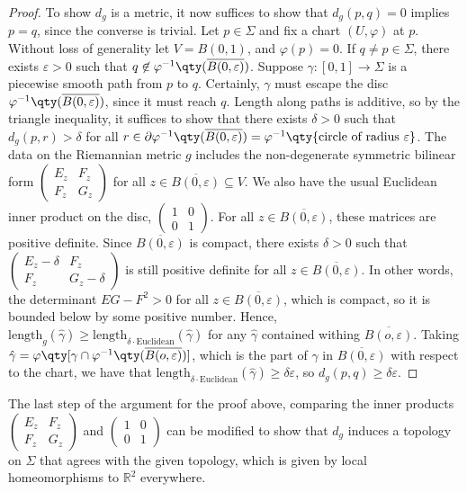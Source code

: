 \begin{proof}
	To show $d_g$ is a metric, it now suffices to show that $d_g(p,q) = 0$ implies $p = q$, since the converse is trivial.
	Let $p \in \Sigma$ and fix a chart $(U,\varphi)$ at $p$.
	Without loss of generality let $V = B(0,1)$, and $\varphi(p) = 0$.
	If $q \neq p \in \Sigma$, there exists $\varepsilon > 0$ such that $q \not\in \varphi^{-1} \qty(\overline{B(0,\varepsilon)})$.
	Suppose $\gamma \colon [0,1] \to \Sigma$ is a piecewise smooth path from $p$ to $q$.
	Certainly, $\gamma$ must escape the disc $\varphi^{-1} \qty(\overline{B(0,\varepsilon)})$, since it must reach $q$.
	Length along paths is additive, so by the triangle inequality, it suffices to show that there exists $\delta > 0$ such that $d_g(p,r) > \delta$ for all $r \in \partial \varphi^{-1} \qty(\overline{B(0,\varepsilon)}) = \varphi^{-1} \qty{ \text{circle of radius } \varepsilon }$.
	The data on the Riemannian metric $g$ includes the non-degenerate symmetric bilinear form $\begin{pmatrix}
		E_z & F_z \\
		F_z & G_z
	\end{pmatrix}$ for all $z \in \overline{B(0,\varepsilon)} \subseteq V$.
	We also have the usual Euclidean inner product on the disc, $\begin{pmatrix}
		1 & 0 \\
		0 & 1
	\end{pmatrix}$.
	For all $z \in \overline{B(0,\varepsilon)}$, these matrices are positive definite.
	Since $\overline{B(0,\varepsilon)}$ is compact, there exists $\delta > 0$ such that
	$\begin{pmatrix}
		E_z - \delta & F_z          \\
		F_z          & G_z - \delta
	\end{pmatrix}$
	is still positive definite for all $z \in \overline{B(0,\varepsilon)}$.
	In other words, the determinant $EG-F^2 > 0$ for all $z \in \overline{B(0,\varepsilon)}$, which is compact, so it is bounded below by some positive number.
	Hence, $\mathrm{length}_g(\hat\gamma) \geq \mathrm{length}_{\delta \cdot \mathrm{Euclidean}}(\hat \gamma)$ for any $\hat \gamma$ contained withing $\overline{B(o,\varepsilon)}$.
	Taking $\hat\gamma = \varphi \qty[ \gamma \cap \varphi^{-1}\qty(\overline{B(o,\varepsilon)}) ]$, which is the part of $\gamma$ in $\overline{B(0,\varepsilon)}$ with respect to the chart, we have that $\mathrm{length}_{\delta \cdot \mathrm{Euclidean}}(\hat \gamma) \geq \delta \varepsilon$, so $d_g(p,q) \geq \delta\varepsilon$.
\end{proof}
\begin{remark}
	The last step of the argument for the proof above, comparing the inner products $\begin{pmatrix}
		E_z & F_z \\
		F_z & G_z
	\end{pmatrix}$ and $\begin{pmatrix}
		1 & 0 \\
		0 & 1
	\end{pmatrix}$ can be modified to show that $d_g$ induces a topology on $\Sigma$ that agrees with the given topology, which is given by local homeomorphisms to $\mathbb R^2$ everywhere.
\end{remark}

